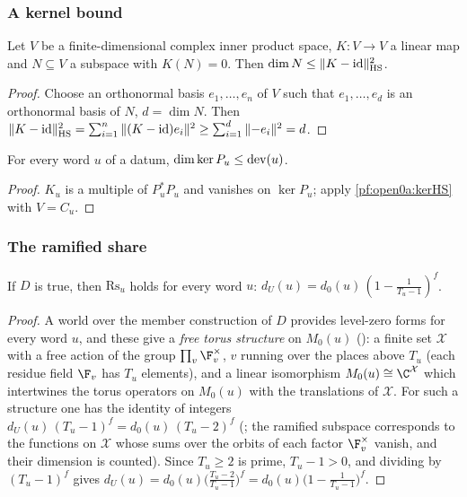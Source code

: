 \subsubsection{A kernel bound}

\begin{lemma}\label{pf:open0a:kerHS}
Let $V$ be a finite-dimensional complex inner product space, $K\colon V\to V$ a linear map and $N\subseteq V$ a
subspace with $K(N)=0$. Then $\dim N\le\|K-\mathrm{id}\|_{\mathrm{HS}}^2$.
\end{lemma}

\begin{proof}
Choose an orthonormal basis $e_1,\dots,e_n$ of $V$ such that $e_1,\dots,e_d$ is an orthonormal basis of $N$,
$d=\dim N$. Then $\|K-\mathrm{id}\|_{\mathrm{HS}}^2=\sum_{i=1}^n\|(K-\mathrm{id})e_i\|^2\ge\sum_{i=1}^d\|{-e_i}\|^2=d$.
\end{proof}

\begin{lemma}\label{pf:open0a:kerPu}
For every word $u$ of a datum, $\dim\ker P_u\le\operatorname{dev}(u)$.
\end{lemma}

\begin{proof}
$K_u$ is a multiple of $P_u^*P_u$ and vanishes on $\ker P_u$; apply \cref{pf:open0a:kerHS} with $V=C_u$.
\end{proof}

\subsubsection{The ramified share}

\begin{lemma}\label{pf:open0a:ramshare}
If $D$ is true, then $\mathrm{Rs}_u$ holds for every word $u$: $d_U(u)=d_0(u)\,(1-\frac1{T_u-1})^f$.
\ 
\end{lemma}

\begin{proof}
A world over the member construction of $D$ provides level-zero forms for every word $u$, and these give a \emph{free
torus structure} on $M_0(u)$ (): a finite set
$\mathcal X$ with a free action of the group $\prod_v\F_v^\times$, $v$ running over the places above $T_u$ (each
residue field $\F_v$ has $T_u$ elements), and a linear isomorphism $M_0(u)\cong\C^{\mathcal X}$ which intertwines the
torus operators on $M_0(u)$ with the translations of $\mathcal X$. For such a structure one has the identity of
integers $d_U(u)\,(T_u-1)^f=d_0(u)\,(T_u-2)^f$
(; the ramified subspace corresponds to the
functions on $\mathcal X$ whose sums over the orbits of each factor $\F_v^\times$ vanish, and their dimension is
counted). Since $T_u\ge2$ is prime, $T_u-1>0$, and dividing by $(T_u-1)^f$ gives
$d_U(u)=d_0(u)\bigl(\frac{T_u-2}{T_u-1}\bigr)^f=d_0(u)\bigl(1-\frac1{T_u-1}\bigr)^f$.
\end{proof}

